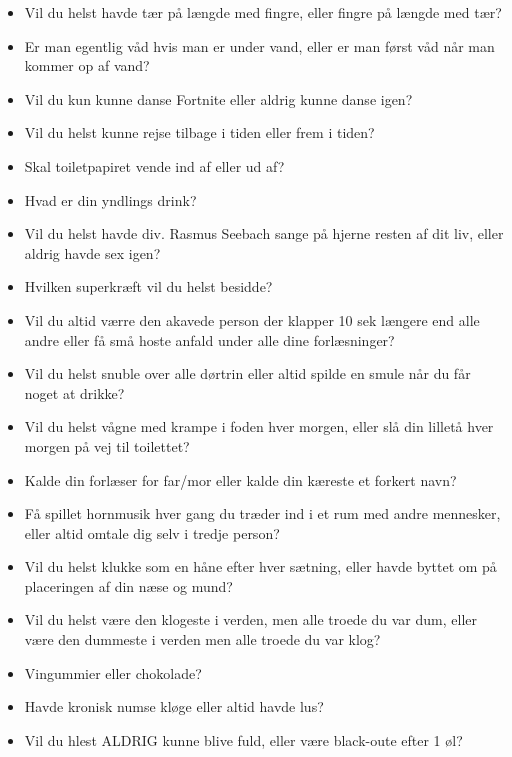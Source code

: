 \begin{itemize}
    \item Vil du helst havde tær på længde med fingre, eller fingre på længde med tær?
    \item Er man egentlig våd hvis man er under vand, eller er man først våd når man kommer op af vand?
    \item Vil du kun kunne danse Fortnite eller aldrig kunne danse igen?
    \item Vil du helst kunne rejse tilbage i tiden eller frem i tiden?
    \item Skal toiletpapiret vende ind af eller ud af?
    \item Hvad er din yndlings drink?
    \item Vil du helst havde div. Rasmus Seebach sange på hjerne resten af dit liv, eller aldrig havde sex igen?
    \item Hvilken superkræft vil du helst besidde?
    \item Vil du altid værre den akavede person der klapper 10 sek længere end alle andre eller få små hoste anfald under alle dine forlæsninger?
    \item Vil du helst snuble over alle dørtrin eller altid spilde en smule når du får noget at drikke?
    \item Vil du helst vågne med krampe i foden hver morgen, eller slå din lilletå hver morgen på vej til toilettet?
    \item Kalde din forlæser for far/mor eller kalde din kæreste et forkert navn?
    \item Få spillet hornmusik hver gang du træder ind i et rum med andre mennesker, eller altid omtale dig selv i tredje person?
    \item Vil du helst klukke som en håne efter hver sætning, eller havde byttet om på placeringen af din næse og mund?
    \item Vil du helst være den klogeste i verden, men alle troede du var dum, eller være den dummeste i verden men alle troede du var klog?
    \item Vingummier eller chokolade?
    \item Havde kronisk numse kløge eller altid havde lus?
    \item Vil du hlest ALDRIG kunne blive fuld, eller være black-oute efter 1 øl?
    
\end{itemize}